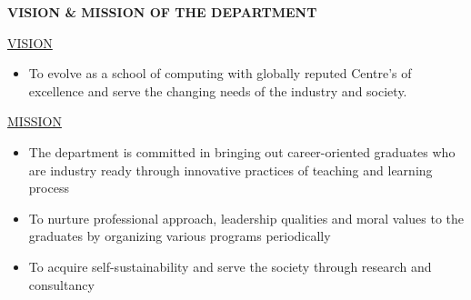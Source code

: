 \thispagestyle{empty}
\begin{center}
  \vspace*{1cm}
  \textbf{\large VISION \& MISSION OF THE DEPARTMENT
}
\end{center}
\begin{center}
  \vspace*{1cm}
  \underline{\large VISION}
\end{center}
\begin{itemize}
    \item To evolve as a school of computing with globally reputed Centre’s of excellence and
serve the changing needs of the industry and society.
\end{itemize}
\begin{center}
  \vspace*{1cm}
  \underline{\large MISSION}
\end{center}
\begin{itemize}
    \item The department is committed in bringing out career-oriented graduates who are
industry ready through innovative practices of teaching and learning process
\item To nurture professional approach, leadership qualities and moral values to the
graduates by organizing various programs periodically
\item To acquire self-sustainability and serve the society through research and
consultancy
\end{itemize}